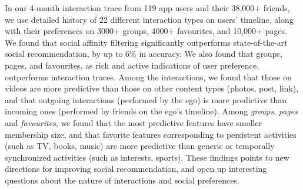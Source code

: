 In our 4-month interaction trace from 119 app users and their 38,000+ friends, 
we use detailed history of 22 different interaction types on users' timeline, 
along with their preferences on 3000+ groups, 4000+ favourites, and 10,000+ pages. 
We found that social affinity filtering significantly 
outperforms state-of-the-art social recommendation, by up to 6\% in accuracy.
We also found that groups, pages, and favourites, 
as rich and active indications of user preference, outperforms interaction traces. 
Among the interactions, we found that those on videos are more predictive than those on other content types (photos, post, link), and that outgoing interactions (performed by the ego) 
is more predictive than incoming ones (performed by friends on the ego's timeline).
Among {\em groups}, {\em pages} and {\em favourites}, we found that the most  
predictive features have smaller membership size, and that favorite features corresponding to 
persistent activities (such as TV, books, music) are more predictive than generic or 
temporally synchronized activities (such as interests, sports). 
These findings points to new directions for improving social recommendation, 
and open up interesting questions about the nature of interactions and social preferences. 



